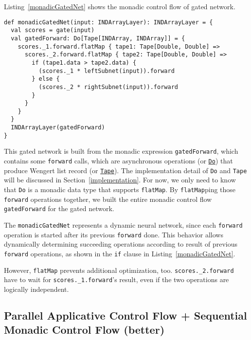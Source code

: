 Listing~\ref{monadicGatedNet} shows the monadic control flow of gated network.

\begin{lstlisting}[float={h t b p},caption={Monadic gated network}, label={monadicGatedNet}]
def monadicGatedNet(input: INDArrayLayer): INDArrayLayer = {
  val scores = gate(input)
  val gatedForward: Do[Tape[INDArray, INDArray]] = {
    scores._1.forward.flatMap { tape1: Tape[Double, Double] =>
      scores._2.forward.flatMap { tape2: Tape[Double, Double] =>
        if (tape1.data > tape2.data) {
          (scores._1 * leftSubnet(input)).forward
        } else {
          (scores._2 * rightSubnet(input)).forward
        }
      }
    }
  }
  INDArrayLayer(gatedForward)
}
\end{lstlisting}

This gated network is built from the monadic expression \lstinline{gatedForward}, which contains some \lstinline{forward} calls, which are asynchronous operations (or \href{https://javadoc.io/page/com.thoughtworks.raii/asynchronous_2.11/latest/com/thoughtworks/raii/asynchronous%24%24Do.html}{\lstinline{Do}}) that produce Wengert list record (or \href{https://javadoc.io/page/com.thoughtworks.deeplearning/deeplearning_2.11/latest/com/thoughtworks/deeplearning/DeepLearning%24%24Tape.html}{\lstinline{Tape}}). The implementation detail of \lstinline{Do} and \lstinline{Tape} will be discussed in Section~\ref{implementation}. For now, we only need to know that \lstinline{Do} is a monadic data type that supports \lstinline{flatMap}. By \lstinline{flatMap}ping those \lstinline{forward} operations together, we built the entire monadic control flow \lstinline{gatedForward} for the gated network.

The \lstinline{monadicGatedNet} represents a dynamic neural network, since each \lstinline{forward} operation is started after its previous \lstinline{forward} done. This behavior allows dynamically determining succeeding operations according to result of previous \lstinline{forward} operations, as shown in the \lstinline{if} clause in Listing~\ref{monadicGatedNet}.

However, \lstinline{flatMap} prevents additional optimization, too.
\lstinline{scores._2.forward} have to wait for \lstinline{scores._1.forward}'s result, even if the two operations are logically independent.

\subsection{Parallel Applicative Control Flow + Sequential Monadic Control Flow (better)}
\label{applicative}

